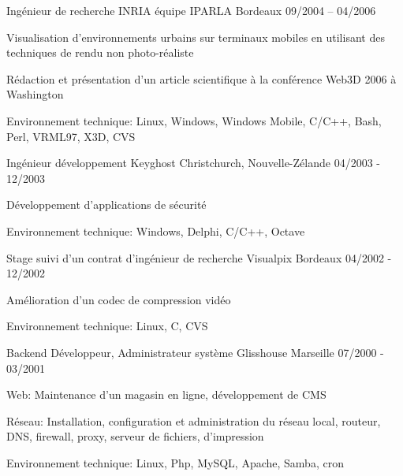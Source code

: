\begin{cventries}
  \cventry
    {Ingénieur de recherche}
    {INRIA équipe IPARLA}
    {Bordeaux}
    {09/2004 – 04/2006}
    {
      \begin{cvitems}
        \item {Visualisation d'environnements urbains sur terminaux mobiles en
            utilisant des techniques de rendu non photo-réaliste}
        \item {Rédaction et présentation d'un article scientifique à la
            conférence Web3D 2006 à Washington}
        \item {Environnement technique: Linux, Windows, Windows Mobile, C/C++,
            Bash, Perl, VRML97, X3D, CVS}
      \end{cvitems}
    }

  \cventry
    {Ingénieur développement}
    {Keyghost}
    {Christchurch, Nouvelle-Zélande}
    {04/2003 - 12/2003}
    {
      \begin{cvitems}
        \item {Développement d'applications de sécurité}
		\item {Environnement technique: Windows, Delphi, C/C++, Octave}
      \end{cvitems}
    }

  \cventry
    {Stage suivi d'un contrat d'ingénieur de recherche}
    {Visualpix}
    {Bordeaux}
    {04/2002 - 12/2002}
    {
      \begin{cvitems}
        \item {Amélioration d'un codec de compression vidéo}
        \item {Environnement technique: Linux, C, CVS}
      \end{cvitems}
    }

  \cventry
    {Backend Développeur, Administrateur système}
    {Glisshouse}
    {Marseille}
    {07/2000 - 03/2001}
    {
      \begin{cvitems}
        \item {Web: Maintenance d'un magasin en ligne, développement de CMS}
        \item {Réseau: Installation, configuration et administration du réseau
            local, routeur, DNS, firewall, proxy, serveur de fichiers,
            d'impression}
        \item {Environnement technique: Linux, Php, MySQL, Apache, Samba, cron}
      \end{cvitems}
    }

\end{cventries}
